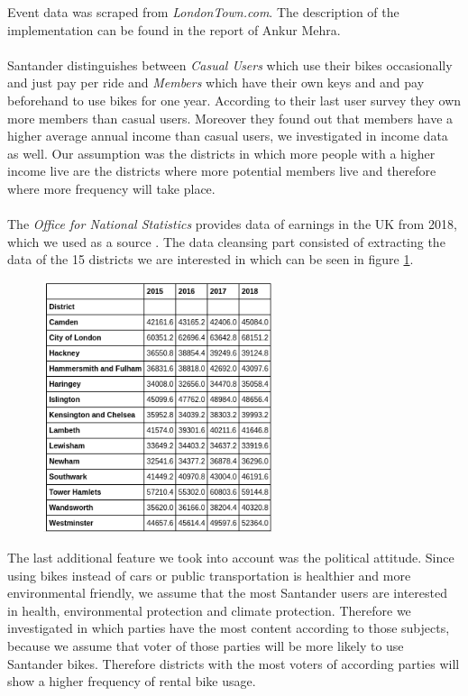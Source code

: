 Event data was scraped from \emph{LondonTown.com}\cite{LondonTown2019}. The description of the implementation can be found in the report of Ankur Mehra.\\\\
Santander distinguishes between \emph{Casual Users} which use their bikes occasionally and just pay per ride and \emph{Members} which have their own keys and and pay beforehand to use bikes for one year. According to their last user survey they own more members than casual users. Moreover they found out that members have a higher average annual income than casual users, we investigated in income data as well. Our assumption was the districts in which more people with a higher income live are the districts where more potential members live and therefore where more frequency will take place.\\\\
The \emph{Office for National Statistics} provides data of earnings in the UK from 2018, which we used as a source \cite{OfficeforNationalStatistics2019}. The data cleansing part consisted of extracting the data of the 15 districts we are interested in which can be seen in figure \ref{fig:earnings}.
\begin{figure}[H]
\centering
\includegraphics[width=0.6\textwidth]{img/earnings}\label{fig:earnings}
\label{fig:earnings}
\end{figure}
The last additional feature we took into account was the political attitude. Since using bikes instead of cars or public transportation is healthier and more environmental friendly, we assume that the most Santander users are interested in health, environmental protection and climate protection. Therefore we investigated in which parties have the most content according to those subjects, because we assume that voter of those parties will be more likely to use Santander bikes. Therefore districts with the most voters of according parties will show a higher frequency of rental bike usage.\\\\
